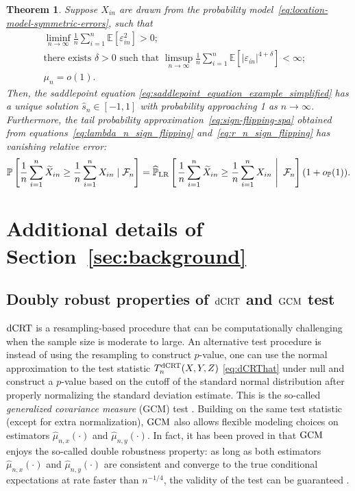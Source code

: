 \documentclass[12pt]{article}
\newtheorem{theorem}{Theorem}
\theoremstyle{definition}
\def\P{\mathbb{P}}
\def\P{\mathbb{P}}
\newcommand{\E}{\mathbb E}								%
\renewcommand{\P}{\mathbb{P}}							%
\newcommand{\srx}{X}									%
\newcommand{\srz}{Z}									%
\newcommand{\sry}{Y}									%
\newcommand{\dCRT}{\textnormal{dCRT}} 					%
\newcommand{\GCM}{\textnormal{GCM}}						%
\begin{document}
\begin{theorem}\label{thm:example}
Suppose $X_{in}$ are drawn from the probability model~\eqref{eq:location-model-symmetric-errors}, such that
	\begin{align}
		\liminf_{n\rightarrow\infty}\frac{1}{n}\sum_{i=1}^n \E[\varepsilon_{in}^2]>0;&\label{eq:lower_bound_second_moment} \\
		\text{there exists $\delta>0$ such that }\limsup_{n\rightarrow\infty}\frac{1}{n}\sum_{i=1}^n\E[|\varepsilon_{in}|^{4+\delta}]<\infty;&\label{eq:upper_bound_four_delta_moment} \\
		\mu_n=o(1).&\label{eq:mu_n_convergence}
	\end{align}
	Then, the saddlepoint equation \eqref{eq:saddlepoint_equation_example_simplified} has a unique solution $\hat s_n\in [-1,1]$ with probability approaching 1 as $n\rightarrow \infty$. Furthermore, the tail probability approximation~\eqref{eq:sign-flipping-spa} obtained from equations~\eqref{eq:lambda_n_sign_flipping} and~\eqref{eq:r_n_sign_flipping} has vanishing relative error:
	\small
	\begin{align}\label{eq:conclusion_example}
	\P\left[\frac{1}{n}\sum_{i=1}^n \widetilde{X}_{in}\geq \frac{1}{n}\sum_{i=1}^n X_{in}\mid \mathcal{F}_n\right]=\widehat{\P}_{\textnormal{LR}}\left[\left.\frac{1}{n}\sum_{i=1}^n \widetilde{X}_{in} \geq \frac{1}{n}\sum_{i=1}^n X_{in}\ \right|\ \mathcal{F}_n\right](1+o_{\P}(1)).
	\end{align}
	\normalsize
\end{theorem}


\section{Additional details of Section~\ref{sec:background}}\label{sec:additional-details-background}

\subsection{Doubly robust properties of $\dCRT$ and $\GCM$ test}\label{sec:double-robustness}


$\dCRT$ is a resampling-based procedure that can be computationally challenging when the sample size is moderate to large. An alternative test procedure is instead of using the resampling to construct $p$-value, one can use the normal approximation to the test statistic $T_n^{\dCRT}(\srx, \sry, \srz)$ \eqref{eq:dCRThat} under null and construct a $p$-value based on the cutoff of the standard normal distribution after properly normalizing the standard deviation estimate. This is the so-called \textit{generalized covariance measure} (GCM) test \citep{Shah2018}. Building on the same test statistic (except for extra normalization), $\GCM$ also allows flexible modeling choices on estimators $\widehat{\mu}_{n,x}(\cdot)$ and $\widehat{\mu}_{n,y}(\cdot)$. In fact, it has been proved in \citet{Shah2018} that $\GCM$ enjoys the so-called double robustness property: as long as both estimators $\widehat\mu_{n,x}(\cdot)$ and $\widehat{\mu}_{n,y}(\cdot)$ are consistent and converge to the true conditional expectations at rate faster than $n^{-1/4}$, the validity of the test can be guaranteed \citep[Theorem 6]{Shah2018}. 
\end{document}
